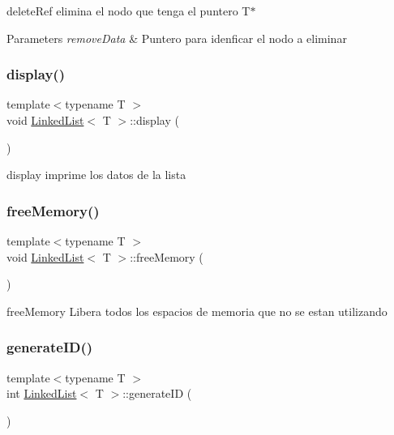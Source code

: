 delete\+Ref elimina el nodo que tenga el puntero T$\ast$ 


\begin{DoxyParams}{Parameters}
{\em remove\+Data} & Puntero para idenficar el nodo a eliminar \\
\hline
\end{DoxyParams}
\mbox{\label{class_linked_list_ab43bd594a0f7f9ff21c96370da575693}} 
\subsubsection{\texorpdfstring{display()}{display()}}
{\footnotesize\ttfamily template$<$typename T $>$ \\
void \hyperlink{class_linked_list}{Linked\+List}$<$ T $>$\+::display (\begin{DoxyParamCaption}{ }\end{DoxyParamCaption})}



display imprime los datos de la lista 

\mbox{\label{class_linked_list_a20857deefa26cdb553b7a5d8b706d84c}} 
\subsubsection{\texorpdfstring{free\+Memory()}{freeMemory()}}
{\footnotesize\ttfamily template$<$typename T $>$ \\
void \hyperlink{class_linked_list}{Linked\+List}$<$ T $>$\+::free\+Memory (\begin{DoxyParamCaption}{ }\end{DoxyParamCaption})}



free\+Memory Libera todos los espacios de memoria que no se estan utilizando 

\mbox{\label{class_linked_list_a0132c7cb9ac724af205c892281e8303f}} 
\subsubsection{\texorpdfstring{generate\+I\+D()}{generateID()}}
{\footnotesize\ttfamily template$<$typename T $>$ \\
int \hyperlink{class_linked_list}{Linked\+List}$<$ T $>$\+::generate\+ID (\begin{DoxyParamCaption}{ }\end{DoxyParamCaption})}



